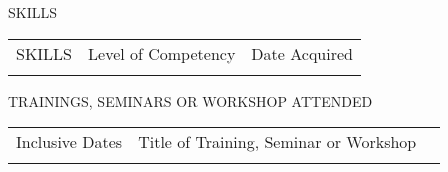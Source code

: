 
\raggedright
\fontsize{11}{13.5}\selectfont SKILLS
\par
\vspace{0.3em}

\begin{tabularx}{\textwidth}{C C C}
SKILLS & Level of Competency & Date Acquired \\
\forlistloop{\AddRow}{\SkillList}
\end{tabularx}
\vspace{1em}


\raggedright
\fontsize{11}{13.5}\selectfont TRAININGS, SEMINARS OR WORKSHOP ATTENDED
\par
\vspace{0.3em}

\begin{tabularx}{\textwidth}{C C C}
Inclusive Dates & Title of Training, Seminar or Workshop \\
\forlistloop{\AddRow}{\TrainingList}
\end{tabularx}
\vspace{1em}


\clearpage
